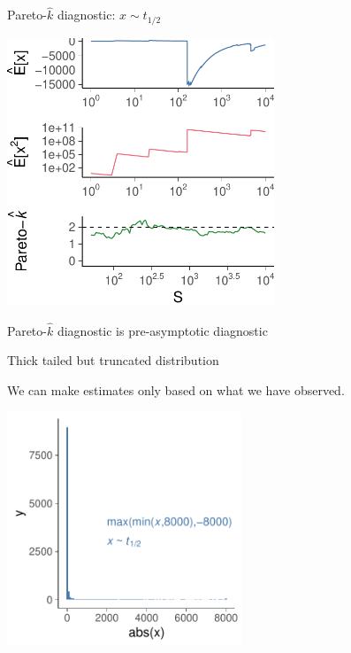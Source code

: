 \documentclass[english,t]{beamer}
\begin{document}
\begin{frame}{Pareto-$\hat{k}$ diagnostic: $x \sim t_{1/2}$}

  \includegraphics[width=8cm]{k5c.pdf}

\end{frame}

\begin{frame}{Pareto-$\hat{k}$ diagnostic is pre-asymptotic diagnostic}

  Thick tailed but truncated distribution
  
  We can make estimates only based on what we have observed.

  \vspace{-0.5\baselineskip}
  \includegraphics[width=7cm]{x6.pdf}

\end{frame}
\end{document}
